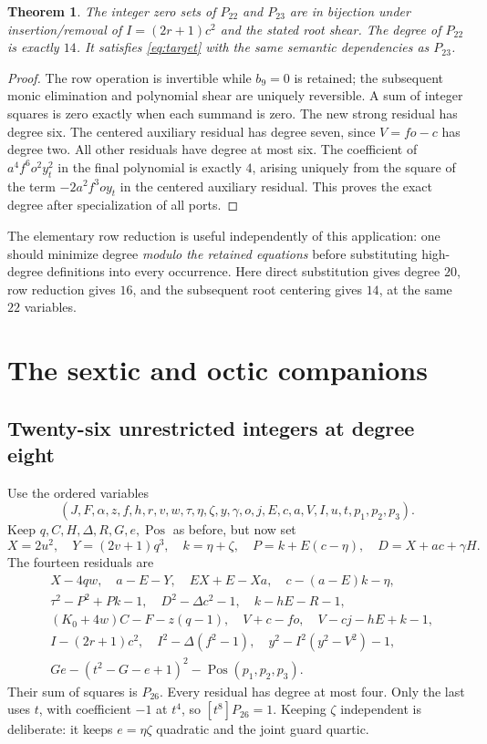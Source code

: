 \documentclass[11pt]{article}
\newtheorem{theorem}{Theorem}[section]
\newcommand{\Pos}{\operatorname{Pos}}
\begin{document}
\begin{theorem}
The integer zero sets of $P_{22}$ and $P_{23}$ are in bijection under
insertion/removal of $I=(2r+1)c^2$ and the stated root shear. The degree of
$P_{22}$ is exactly $14$.
It satisfies \eqref{eq:target} with the same semantic dependencies as
$P_{23}$.
\end{theorem}
\begin{proof}
The row operation is invertible while $b_9=0$ is retained; the subsequent
monic elimination and polynomial shear are uniquely reversible. A sum of integer squares is zero
exactly when each summand is zero.
The new strong residual has degree six. The centered auxiliary residual has
degree seven, since $V=fo-c$ has degree two. All other residuals have degree
at most six. The coefficient of $a^4f^6o^2y_t^2$ in the final polynomial is
exactly $4$, arising uniquely from the square of the term $-2a^2f^3oy_t$
in the centered auxiliary residual. This proves the exact degree after specialization of all ports.
\end{proof}
The elementary row reduction is useful independently of this application:
one should minimize degree \emph{modulo the retained equations} before
substituting high-degree definitions into every occurrence. Here direct
substitution gives degree $20$, row reduction gives $16$, and the subsequent
root centering gives $14$, at the same $22$ variables.

\section{The sextic and octic companions}
\subsection{Twenty-six unrestricted integers at degree eight}
Use the ordered variables
\[
 (J,F,\alpha,z,f,h,r,v,w,\tau,\eta,\zeta,y,\gamma,o,j,E,c,a,V,I,u,t,p_1,p_2,p_3).
\]
Keep $q,C,H,\Delta,R,G,e,\Pos$ as before, but now set
\[
 X=2u^2,\quad Y=(2v+1)q^3,\quad k=\eta+\zeta,\quad
 P=k+E(c-\eta),\quad D=X+ac+\gamma H.
\]
The fourteen residuals are
\begin{align*}
 &X-4qw,\quad a-E-Y,\quad EX+E-Xa,\quad c-(a-E)k-\eta,\\
 &\tau^2-P^2+Pk-1,\quad D^2-\Delta c^2-1,\quad k-hE-R-1,\\
 &(K_0+4w)C-F-z(q-1),\quad V+c-fo,\quad V-cj-hE+k-1,\\
 &I-(2r+1)c^2,\quad I^2-\Delta(f^2-1),\quad
 y^2-I^2(y^2-V^2)-1,\\
 &Ge-(t^2-G-e+1)^2-\Pos(p_1,p_2,p_3).
\end{align*}
Their sum of squares is $P_{26}$. Every residual has degree at most four.
Only the last uses $t$, with coefficient $-1$ at $t^4$, so
$[t^8]P_{26}=1$. Keeping $\zeta$ independent is deliberate: it keeps
$e=\eta\zeta$ quadratic and the joint guard quartic.
\end{document}
